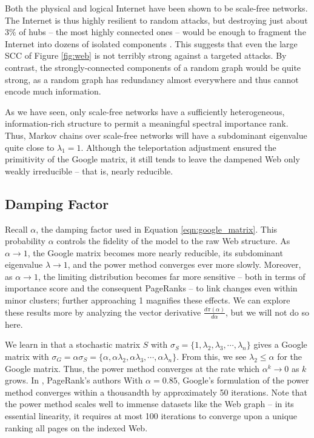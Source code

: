 \documentclass[11pt,letterpaper]{amsart}
\begin{document}
Both the physical and logical Internet have been shown to be scale-free
networks. The Internet is thus highly resilient to random attacks, but
destroying just about 3\% of hubs -- the most highly connected ones -- would be
enough to fragment the Internet into dozens of isolated components
\cite{barabasiNetworkScienceScaleFree}. This suggests that even the large SCC of
Figure \ref{fig:web} is not terribly strong against a targeted attacks. By
contrast, the strongly-connected components of a random graph would be quite
strong, as a random graph has redundancy almost everywhere and thus cannot
encode much information.

As we have seen, only scale-free networks have a sufficiently heterogeneous,
information-rich structure to permit a meaningful spectral importance rank.
Thus, Markov chains over scale-free networks will have a subdominant eigenvalue
quite close to $\lambda_1 = 1$. Although the teleportation adjustment ensured
the primitivity of the Google matrix, it still tends to leave the dampened Web
only weakly irreducible -- that is, nearly reducible.


\subsection{Damping Factor}
Recall $\alpha$, the damping factor used in Equation \eqref{eqn:google_matrix}.
This probability $\alpha$ controls the fidelity of the model to the raw Web
structure. As $\alpha \to 1$, the Google matrix becomes more nearly reducible,
its subdominant eigenvalue $\lambda \to 1$, and the power method converges ever
more slowly. Moreover, as $\alpha \to 1$, the limiting distribution becomes far
more sensitive -- both in terms of importance score and the consequent PageRanks
-- to link changes even within minor clusters; further approaching 1 magnifies
these effects. We can explore these results more by analyzing the vector
derivative $\frac{d\pi(\alpha)}{d\alpha}$, but we will not do so here.

We learn in \cite{haveliwalaSecondEigenvalueGoogle} that a stochastic matrix $S$
with $\sigma_S = \{ 1, \lambda_2, \lambda_3, \cdots, \lambda_n \}$ gives a
Google matrix with
$\sigma_G = \alpha\sigma_S = \{ \alpha, \alpha\lambda_2, \alpha\lambda_3,
\cdots, \alpha\lambda_n \}$. From this, we see $\lambda_2 \leq \alpha$ for the
Google matrix. Thus, the power method converges at the rate which
$\alpha^k \to 0$ as $k$ grows. In \cite{brinPageRankCitationRanking1998},
PageRank's authors With $\alpha = 0.85$, Google's formulation of the power
method converges within a thousandth by approximately 50 iterations. Note that
the power method scales well to immense datasets like the Web graph -- in its
essential linearity, it requires at most 100 iterations to converge upon a
unique ranking all pages on the indexed Web.
\end{document}
